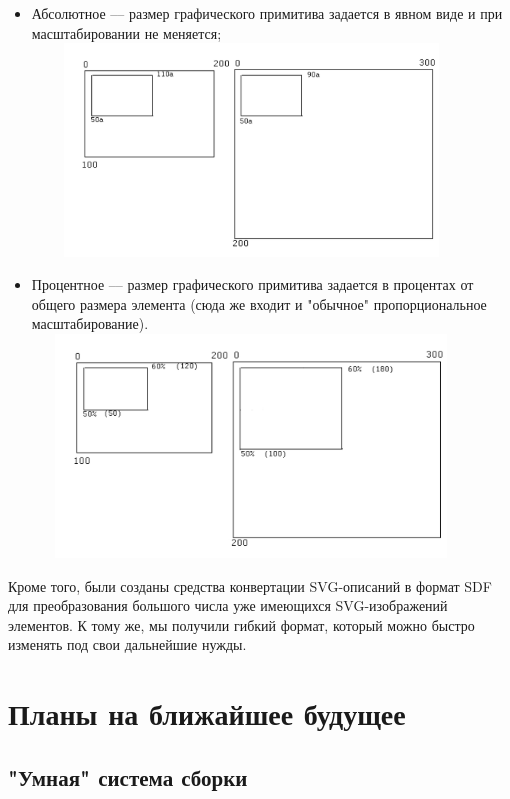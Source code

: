 \documentclass[a5paper]{article}
\begin{document}
\begin{itemize}
  \item Абсолютное --– размер графического примитива задается в явном виде и при
	масштабировании не меняется;\newline
    \includegraphics[width=11.622cm,height=5.646cm]{draft04-img4.jpg}
  \item Процентное --– размер графического примитива задается в процентах от
	общего размера элемента (сюда же входит и "обычное" пропорциональное
	масштабирование).\newline
    \includegraphics[width=11.582cm,height=5.927cm]{draft04-img5.jpg}
\end{itemize}

Кроме того, были созданы средства конвертации SVG-описаний в формат SDF
для преобразования большого числа уже имеющихся SVG-изображений
элементов. К тому же, мы получили гибкий формат, который можно быстро
изменять под свои дальнейшие нужды.

\section{Планы на ближайшее будущее}
\subsection{"Умная" система сборки}
\end{document}
